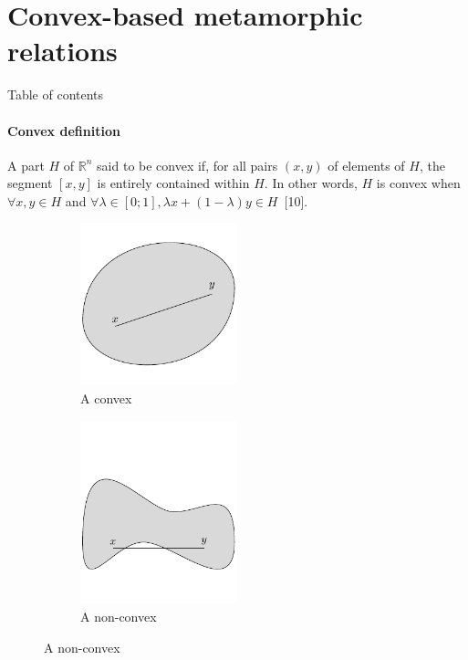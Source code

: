\documentclass[aspectratio=169,dvipsnames]{beamer}
\begin{document}
\section{Convex-based metamorphic relations}

\begin{frame}{Table of contents}
	\tableofcontents[currentsection]
\end{frame}

\begin{frame}{\secname}
	\framesubtitle{Convex definition}

	\begin{definition}
		A part $H$ of $\mathbb{R}^{n}$ said to be convex if, for all pairs $(x,y)$ of elements of $H$, the segment $[x,y]$ is entirely contained within $H$.
		In other words, $H$ is convex when $\forall x,y \in H$ and $\forall \lambda \in [0;1], \lambda x + (1-\lambda)y \in H$~[10].
	\end{definition}

	\begin{figure}[H]
		\centering
		\begin{subfigure}{0.45\textwidth}
			\centering
			\includegraphics[width=0.5\textwidth]{./figures/example_convex}
			\caption{A convex}
		\end{subfigure}
		\hfill
		\begin{subfigure}{0.45\textwidth}
			\centering
			\includegraphics[width=0.5\textwidth]{./figures/example_non_convex}
			\caption{A non-convex}
		\end{subfigure}
	\end{figure}
\end{frame}
\end{document}

